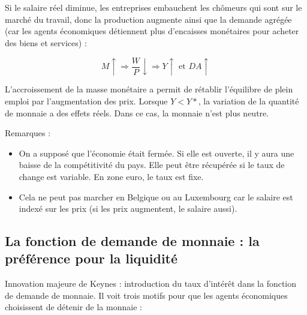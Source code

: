 	Si le salaire réel diminue, les entreprises embauchent les chômeurs qui sont sur le marché du travail, donc la production augmente ainsi que la demande agrégée (car les agents économiques détiennent plus d'encaisses monétaires pour acheter des biens et services) :
	
	$$M \uparrow \Rightarrow \frac{W}{P} \downarrow \Rightarrow Y \uparrow \text{ et } DA \uparrow$$
	
	L'accroissement de la masse monétaire a permit de rétablir l'équilibre de plein emploi par l'augmentation des prix. Lorsque $Y < Y*$, la variation de la quantité de monnaie a des effets réels. Dans ce cas, la monnaie n'est plus neutre.
	
	Remarques :
	
	\begin{itemize}
		\item On a supposé que l'économie était fermée. Si elle est ouverte, il y aura une baisse de la compétitivité du pays. Elle peut être récupérée si le taux de change est variable. En zone euro, le taux est fixe.
		\item Cela ne peut pas marcher en Belgique ou au Luxembourg car le salaire est indexé sur les prix (si les prix augmentent, le salaire aussi).
	\end{itemize}
	
	
	
	\subsection{La fonction de demande de monnaie : la préférence pour la liquidité}
	
	Innovation majeure de Keynes : introduction du taux d'intérêt dans la fonction de demande de monnaie. Il voit trois motifs pour que les agents économiques choisissent de détenir de la monnaie :
	
